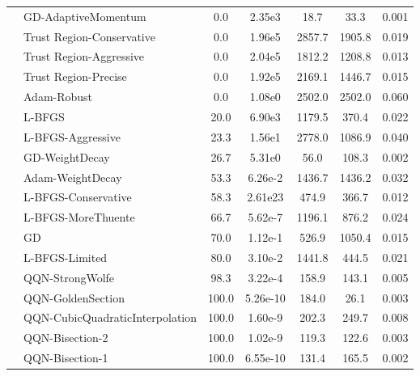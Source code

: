 \documentclass{article}
\begin{document}
\begin{table}[htbp]
{\begin{tabular}{p{2.5cm}p{2.5cm}*{5}{c}}
 & GD-AdaptiveMomentum & 0.0 & 2.35e3 & 18.7 & 33.3 & 0.001 \\
 & Trust Region-Conservative & 0.0 & 1.96e5 & 2857.7 & 1905.8 & 0.019 \\
 & Trust Region-Aggressive & 0.0 & 2.04e5 & 1812.2 & 1208.8 & 0.013 \\
 & Trust Region-Precise & 0.0 & 1.92e5 & 2169.1 & 1446.7 & 0.015 \\
 & Adam-Robust & 0.0 & 1.08e0 & 2502.0 & 2502.0 & 0.060 \\
 & L-BFGS & 20.0 & 6.90e3 & 1179.5 & 370.4 & 0.022 \\
 & L-BFGS-Aggressive & 23.3 & 1.56e1 & 2778.0 & 1086.9 & 0.040 \\
 & GD-WeightDecay & 26.7 & 5.31e0 & 56.0 & 108.3 & 0.002 \\
 & Adam-WeightDecay & 53.3 & 6.26e-2 & 1436.7 & 1436.2 & 0.032 \\
 & L-BFGS-Conservative & 58.3 & 2.61e23 & 474.9 & 366.7 & 0.012 \\
 & L-BFGS-MoreThuente & 66.7 & 5.62e-7 & 1196.1 & 876.2 & 0.024 \\
 & GD & 70.0 & 1.12e-1 & 526.9 & 1050.4 & 0.015 \\
 & L-BFGS-Limited & 80.0 & 3.10e-2 & 1441.8 & 444.5 & 0.021 \\
 & QQN-StrongWolfe & 98.3 & 3.22e-4 & 158.9 & 143.1 & 0.005 \\
 & QQN-GoldenSection & 100.0 & 5.26e-10 & 184.0 & 26.1 & 0.003 \\
 & QQN-CubicQuadraticInterpolation & 100.0 & 1.60e-9 & 202.3 & 249.7 & 0.008 \\
 & QQN-Bisection-2 & 100.0 & 1.02e-9 & 119.3 & 122.6 & 0.003 \\
 & QQN-Bisection-1 & 100.0 & 6.55e-10 & 131.4 & 165.5 & 0.002 \\
\midrule
\bottomrule
\end{tabular}
}
\end{table}
\end{document}
